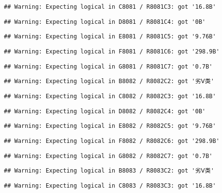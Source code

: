 \documentclass[
]{article}
\begin{document}
\begin{verbatim}
## Warning: Expecting logical in C8081 / R8081C3: got '16.8B'
\end{verbatim}

\begin{verbatim}
## Warning: Expecting logical in D8081 / R8081C4: got '0B'
\end{verbatim}

\begin{verbatim}
## Warning: Expecting logical in E8081 / R8081C5: got '9.76B'
\end{verbatim}

\begin{verbatim}
## Warning: Expecting logical in F8081 / R8081C6: got '298.9B'
\end{verbatim}

\begin{verbatim}
## Warning: Expecting logical in G8081 / R8081C7: got '0.7B'
\end{verbatim}

\begin{verbatim}
## Warning: Expecting logical in B8082 / R8082C2: got '劣Ⅴ类'
\end{verbatim}

\begin{verbatim}
## Warning: Expecting logical in C8082 / R8082C3: got '16.8B'
\end{verbatim}

\begin{verbatim}
## Warning: Expecting logical in D8082 / R8082C4: got '0B'
\end{verbatim}

\begin{verbatim}
## Warning: Expecting logical in E8082 / R8082C5: got '9.76B'
\end{verbatim}

\begin{verbatim}
## Warning: Expecting logical in F8082 / R8082C6: got '298.9B'
\end{verbatim}

\begin{verbatim}
## Warning: Expecting logical in G8082 / R8082C7: got '0.7B'
\end{verbatim}

\begin{verbatim}
## Warning: Expecting logical in B8083 / R8083C2: got '劣Ⅴ类'
\end{verbatim}

\begin{verbatim}
## Warning: Expecting logical in C8083 / R8083C3: got '16.8B'
\end{verbatim}
\end{document}
